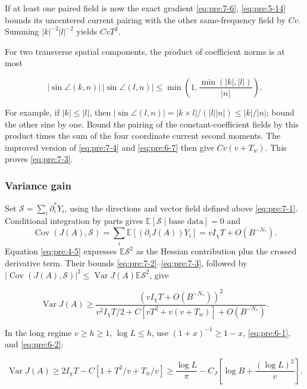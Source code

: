 If at least one paired field is now the exact gradient \eqref{eq:pre:7-6}, \eqref{eq:pre:5-14} bounds its uncentered current pairing with the other same-frequency field by \(Cv\). Summing \(|k|^{-2}|l|^{-2}\) yields \(CvT^2\).

For two transverse spatial components, the product of coefficient norms is at most

\begin{equation}
|\sin\angle(k,n)|\,|\sin\angle(l,n)|
\leq\min\left(1,\frac{\min(|k|,|l|)}{|n|}\right).
\label{eq:pre:7-7}
\end{equation}

For example, if \(|k|\leq|l|\), then \(|\sin\angle(l,n)|=|k\times l|/(|l||n|)\leq|k|/|n|\); bound the other sine by one. Bound the pairing of the constant-coefficient fields by this product times the sum of the four coordinate current second moments. The improved version of \eqref{eq:pre:7-4} and \eqref{eq:pre:6-7} then give \(Cv(v+T_w)\). This proves \eqref{eq:pre:7-3}.

\subsubsection{Variance gain}\label{pre:part-7-2}

Set \(\mathcal S=\sum_i\partial_i^*Y_i\), using the directions and
vector field defined above \eqref{eq:pre:7-1}. Conditional
integration by parts gives \(\mathbb E[\mathcal S\mid\text{base data}]=0\)
and
\[
 \operatorname{Cov}(J(A),\mathcal S)
 =\sum_i\mathbb E[(\partial_iJ(A))Y_i]
 =vI_\chi T+O(B^{-N_*}).
\]
Equation \eqref{eq:pre:4-5} expresses \(\mathbb E\mathcal S^2\) as the
Hessian contribution plus the crossed derivative term. Their bounds
\eqref{eq:pre:7-2}--\eqref{eq:pre:7-3}, followed by
\(|\operatorname{Cov}(J(A),\mathcal S)|^2
\leq\operatorname{Var}J(A)\mathbb E\mathcal S^2\), give

\begin{equation}
\operatorname{Var}J(A)
\geq
\frac{(vI_\chi T+O(B^{-N_*}))^2}
{v^2I_\chi T/2+C[vT^2+v(v+T_w)]+O(B^{-N_*})}.
\label{eq:pre:7-8}
\end{equation}

In the long regime \(v\geq h\geq1\), \(\log L\leq h\), use \((1+x)^{-1}\geq1-x\), \eqref{eq:pre:6-1}, and \eqref{eq:pre:6-2}:

\begin{equation}
\operatorname{Var}J(A)
\geq2I_\chi T-C[1+T^2/v+T_w/v]
\geq\frac{\log L}{\pi}-C_J\left[\log B+\frac{(\log L)^2}{v}\right].
\label{eq:pre:7-9}
\end{equation}

